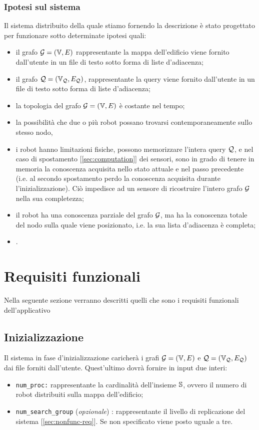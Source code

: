 \documentclass{llncs}
\begin{document}
\subsubsection{Ipotesi sul sistema}
\label{sec:hypotesis}
Il sistema distribuito della quale stiamo fornendo la descrizione è stato progettato per funzionare
sotto determinate ipotesi quali:
\begin{itemize}
	\item il grafo $\mathcal{G} = ( \mathbb{V}, E)$ rappresentante la mappa dell'edificio viene fornito dall'utente in un
	file di testo sotto forma di liste d'adiacenza;
	\item il grafo  $\mathcal{Q} = (\mathbb{V}_{\mathcal{Q}}, E_{\mathcal{Q}})$,  rappresentante la query viene fornito dall'utente in un
	file di testo sotto forma di liste d'adiacenza;
	\item la topologia del grafo $\mathcal{G} = ( \mathbb{V}, E)$ è costante nel tempo;
	\item la possibilità che due o più robot possano trovarsi contemporaneamente sullo stesso nodo,
	\item i robot hanno limitazioni fisiche, possono memorizzare l'intera  query $\mathcal{Q}$, e
	nel caso di spostamento [\ref{sec:computation}] dei sensori, sono in grado di tenere
	in memoria la conoscenza acquisita nello stato attuale e nel passo
	precedente (i.e. al secondo spostamento perdo la conoscenza acquisita
	durante l'inizializzazione). Ciò impedisce ad un sensore di ricostruire l'intero grafo $\mathcal{G}$ nella sua completezza;
	\item il robot ha una conoscenza parziale del grafo $\mathcal{G}$, ma ha la conoscenza
	totale del nodo sulla quale viene posizionato, i.e. la sua lista d'adiacenza è completa;
	\item {}.
\end{itemize}
\section{Requisiti funzionali}
Nella seguente sezione verranno descritti quelli che sono i requisiti funzionali dell'applicativo
\subsection{Inizializzazione}
Il sistema in fase d'inizializzazione caricherà i grafi $\mathcal{G} = ( \mathbb{V}, E)$ e $\mathcal{Q} = (\mathbb{V}_{\mathcal{Q}}, E_{\mathcal{Q}})$ dai
file forniti dall'utente. Quest'ultimo dovrà fornire in input due interi:
\begin{itemize}
\item \texttt{num\_proc:} rappresentante la cardinalità dell'insieme $\mathbb{S}$, ovvero il numero di
robot distribuiti sulla mappa dell'edificio;
\item \texttt{num\_search\_group} (\emph{opzionale}) : rappresentante
il livello di replicazione del sistema [\ref*{sec:nonfunc-req}]. Se non specificato viene posto uguale a tre.
\end{itemize}
\end{document}

